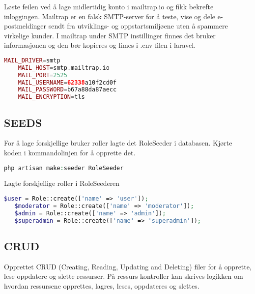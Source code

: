 Løste feilen ved å lage midlertidig konto i mailtrap.io og fikk bekrefte inloggingen.
Mailtrap\cite{mailtrap2019setfsad} er en falsk SMTP-server for å teste, vise og dele e-postmeldinger sendt fra utviklings- og oppstartsmiljøene uten å spammere virkelige kunder.
I mailtrap under SMTP instillinger finnes det bruker informasjonen og den bør kopieres og limes i .env filen i laravel.

\begin{lstlisting}[language=PHP]
    MAIL_DRIVER=smtp
    MAIL_HOST=smtp.mailtrap.io
    MAIL_PORT=2525
    MAIL_USERNAME=62338a10f2cd0f
    MAIL_PASSWORD=b67a88da87aecc
    MAIL_ENCRYPTION=tls
\end{lstlisting}

\subsection{SEEDS}
For å lage forskjellige bruker roller lagte det RoleSeeder i databasen.
Kjørte koden i kommandolinjen for å opprette det.
\begin{lstlisting}[language=PHP]
    php artisan make:seeder RoleSeeder
\end{lstlisting}
Lagte forskjellige roller i RoleSeederen
\begin{lstlisting}[language=PHP]
    $user = Role::create(['name' => 'user']);
   $moderator = Role::create(['name' => 'moderator']);
   $admin = Role::create(['name' => 'admin']);
   $superadmin = Role::create(['name' => 'superadmin']);
\end{lstlisting}
\subsection{CRUD}       
Opprettet CRUD (Creating, Reading, Updating and Deleting) filer for å opprette, lese oppdatere og slette ressurser. På ressurs kontroller kan skrives logikken om hvordan ressursene opprettes, lagres, leses, oppdateres og slettes. 

